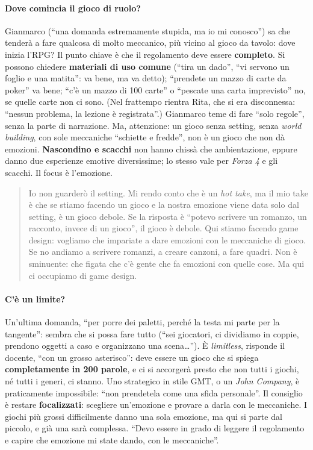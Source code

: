\paragraph{Dove comincia il gioco di ruolo?} Gianmarco (``una domanda estremamente
stupida, ma io mi conosco'') sa che tenderà a fare qualcosa di molto meccanico, più
vicino al gioco da tavolo: dove inizia l'RPG? Il punto chiave è che il regolamento
deve essere \textbf{completo}. Si possono chiedere \textbf{materiali di uso comune}
(``tira un dado'', ``vi servono un foglio e una matita'': va bene, ma va detto); ``prendete
un mazzo di carte da poker'' va bene; ``c'è un mazzo di 100 carte'' o ``pescate una carta
imprevisto'' no, se quelle carte non ci sono. (Nel frattempo rientra Rita, che si era
disconnessa: ``nessun problema, la lezione è registrata''.) Gianmarco teme di fare
``solo regole'', senza la parte di narrazione. Ma, attenzione: un gioco senza setting,
senza \emph{world building}, con sole meccaniche ``schiette e fredde'', non è un gioco
che non dà emozioni. \textbf{Nascondino e scacchi} non hanno chissà che ambientazione,
eppure danno due esperienze emotive diversissime; lo stesso vale per \emph{Forza 4} e
gli scacchi. Il focus è l'emozione.

\begin{quote}
Io non guarderò il setting. Mi rendo conto che è un \emph{hot take}, ma il mio take è
che se stiamo facendo un gioco e la nostra emozione viene data solo dal setting, è un
gioco debole. Se la risposta è ``potevo scrivere un romanzo, un racconto, invece di un
gioco'', il gioco è debole. Qui stiamo facendo game design: vogliamo che impariate a
dare emozioni con le meccaniche di gioco. Se no andiamo a scrivere romanzi, a creare
canzoni, a fare quadri. Non è sminuente: che figata che c'è gente che fa emozioni con
quelle cose. Ma qui ci occupiamo di game design.
\end{quote}

\paragraph{C'è un limite?} Un'ultima domanda, ``per porre dei paletti, perché la testa
mi parte per la tangente'': sembra che si possa fare tutto (``sei giocatori, ci
dividiamo in coppie, prendono oggetti a caso e organizzano una scena\ldots''). È
\emph{limitless}, risponde il docente, ``con un grosso asterisco'': deve essere un gioco
che si spiega \textbf{completamente in 200 parole}, e ci si accorgerà presto che non
tutti i giochi, né tutti i generi, ci stanno. Uno strategico in stile GMT, o un
\emph{John Company}, è praticamente impossibile: ``non prendetela come una sfida
personale''. Il consiglio è restare \textbf{focalizzati}: scegliere un'emozione e
provare a darla con le meccaniche. I giochi più grossi difficilmente danno una sola
emozione, ma qui si parte dal piccolo, e già una sarà complessa. ``Devo essere in grado
di leggere il regolamento e capire che emozione mi state dando, con le meccaniche''.


